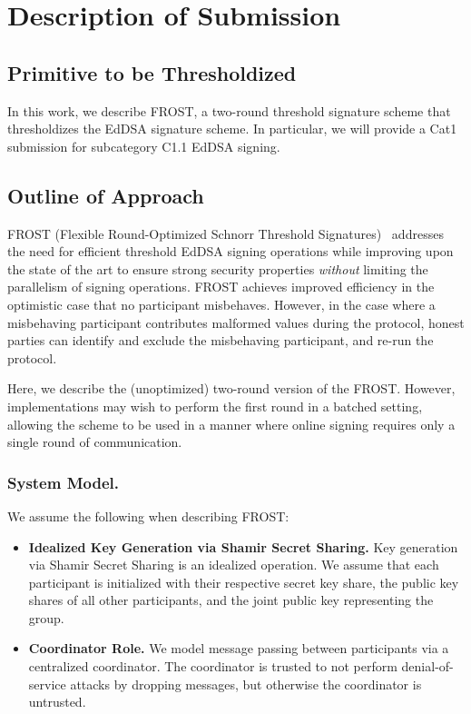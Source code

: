 \section{Description of Submission}

\subsection{Primitive to be Thresholdized}

In this work,
we describe FROST,
a two-round threshold signature scheme that thresholdizes the EdDSA signature scheme.
In particular,
we will provide a Cat1 submission for subcategory C1.1 EdDSA signing.

\subsection{Outline of Approach}

FROST (Flexible Round-Optimized Schnorr Threshold Signatures)~\cite{KomloG20,BellareCKMTZ22} addresses the need for efficient threshold EdDSA signing operations while improving upon the state of the art to ensure strong security properties \emph{without} limiting the parallelism of signing operations.
FROST achieves improved efficiency in the optimistic case that no participant misbehaves.
However, in the case where a misbehaving participant contributes malformed values during the protocol,
honest parties can identify and exclude the misbehaving participant, and re-run the protocol.

Here, we describe the (unoptimized) two-round version of the FROST.
However, implementations may wish to perform the first round in a batched setting,
allowing the scheme to be used in a manner where online signing requires only a single round of communication.

\subsubsection{System Model.}
We assume the following when describing FROST:

\begin{itemize}[itemsep=0.5em]
\item \textbf{Idealized Key Generation via Shamir Secret Sharing.} Key generation via Shamir Secret Sharing is an idealized operation.
We assume that each participant is initialized with their respective secret key share,
the public key shares of all other participants,
and the joint public key representing the group.
\item \textbf{Coordinator Role.} We model message passing between participants
via a centralized coordinator.
The coordinator is trusted to not perform denial-of-service attacks by dropping messages,
but otherwise the coordinator is untrusted.
\end{itemize}

